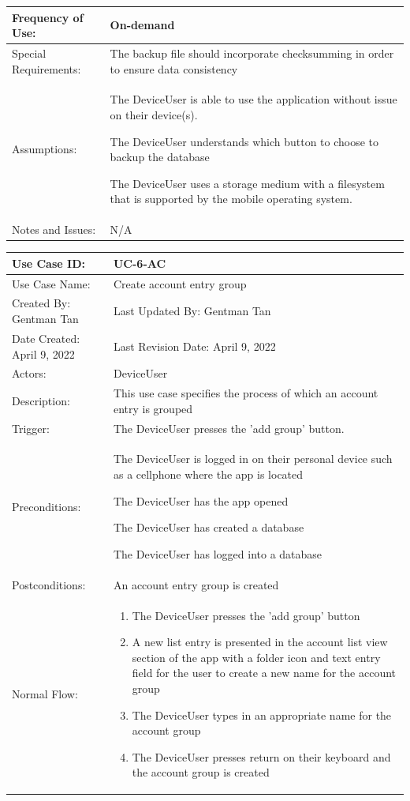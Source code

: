 \documentclass[stu]{apa7}
\newcommand{\nextitem}{\par\hspace*{\labelsep}\textbullet\hspace*{\labelsep}}
\begin{document}
{\begin{xltabular}{\textwidth}{|l|X|}
  Frequency of Use: & On-demand \\ \hline

  Special Requirements: & \nextitem The backup file should incorporate checksumming in order to ensure data consistency \\ \hline

  Assumptions: & \nextitem The DeviceUser is able to use the application without issue on their device(s). \nextitem The DeviceUser understands which button to choose to backup the database \nextitem The DeviceUser uses a storage medium with a filesystem that is supported by the mobile operating system. \\ \hline

  Notes and Issues: & N/A \\ \hline

\end{xltabular}

\scriptsize{\begin{xltabular}{\textwidth}{|l|X|}
  \hline Use Case ID: & UC-6-AC \\ \hline

  Use Case Name: & Create account entry group \\ \hline

  Created By: Gentman Tan & Last Updated By: Gentman Tan\\ \hline

  Date Created: April 9, 2022 & Last Revision Date: April 9, 2022 \\ \hline

  Actors: & \nextitem DeviceUser \\ \hline

  Description: & This use case specifies the process of which an account entry is grouped \\ \hline

  Trigger: & The DeviceUser presses the 'add group' button. \\ \hline

  Preconditions: & \nextitem The DeviceUser is logged in on their personal device such as a cellphone where the app is located \nextitem The DeviceUser has the app opened \nextitem The DeviceUser has created a database \nextitem The DeviceUser has logged into a database \\ \hline

  Postconditions: & \nextitem An account entry group is created \\ \hline

  Normal Flow: &
    \begin{enumerate}
            \item The DeviceUser presses the 'add group' button
            \item A new list entry is presented in the account list view section of the app with a folder icon and text entry field for the user to create a new name for the account group
            \item The DeviceUser types in an appropriate name for the account group
            \item The DeviceUser presses return on their keyboard and the account group is created


\end{enumerate}
\end{xltabular}}}
\end{document}
